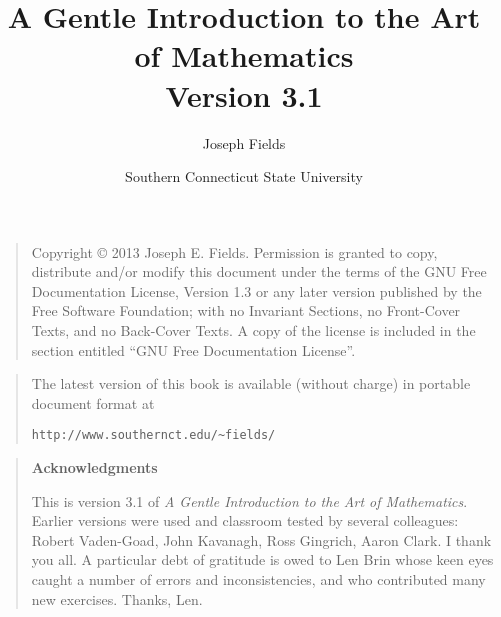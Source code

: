 \documentclass[dvips,12pt,twoside]{book}
\begin{document}
\frontmatter

\title{A Gentle Introduction to the Art of Mathematics\\ {\small Version 3.1  }}
\author{Joseph Fields}
\date{Southern Connecticut State University}

\maketitle

\clearpage

\rule{0pt}{0pt}

\vfill

\begin{quote}
    Copyright \copyright{}  2013  Joseph E. Fields.
    Permission is granted to copy, distribute and/or modify this document
    under the terms of the GNU Free Documentation License, Version 1.3
    or any later version published by the Free Software Foundation;
    with no Invariant Sections, no Front-Cover Texts, and no Back-Cover Texts.
    A copy of the license is included in the section entitled ``GNU
    Free Documentation License''.
\end{quote}

\vfill

\begin{quote}
The latest version of this book is available (without charge) in portable document format at \newline
\rule{0pt}{0pt} \hspace{1in} \verb+http://www.southernct.edu/~fields/+
\end{quote}

\vfill

\clearpage

\rule{0pt}{0pt}

\vfill

\begin{quote}
{\Large \bf Acknowledgments} 

   This is version 3.1 of {\em A Gentle Introduction to the Art of Mathematics}.
Earlier versions were used and classroom tested by several colleagues: 
Robert Vaden-Goad, John Kavanagh, Ross Gingrich, Aaron Clark.  I thank you all.  
A particular debt of gratitude is owed to Len Brin whose keen eyes caught 
a number of errors and inconsistencies, and who contributed many new 
exercises.  Thanks, Len. 
  
\end{quote}
\end{document}
